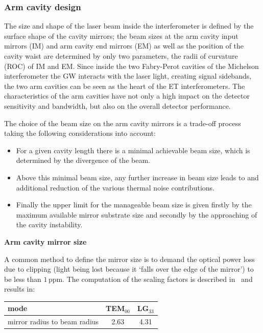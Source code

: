 \subsubsection{Arm cavity design}
\label{sec:arm_cavity_design}

The size and shape of the laser beam inside the interferometer is defined by the surface shape of the cavity mirrors; the beam sizes at the arm cavity input mirrors (IM) and arm cavity end mirrors (EM) as well as the position of the cavity waist are determined by only two parameters, the radii of curvature (ROC) of IM and EM. Since inside the two Fabry-Perot cavities of the Michelson interferometer the GW interacts with the laser light, creating signal sidebands, the two arm cavities can be seen as the heart of the ET interferometers. The characteristics of the arm cavities have not only a high impact on the detector sensitivity and bandwidth, but also on the overall detector performance.

The choice of the beam size on the arm cavity mirrors is a trade-off process taking the following considerations into account:
\begin{itemize}
  \item For a given cavity length there is a minimal achievable beam size, which is determined by the divergence of the beam.
\item Above this minimal beam size, any further increase in beam size leads to and additional reduction of the various thermal noise contributions.
\item Finally the upper limit for the manageable beam size is given firstly by the maximum available mirror substrate size and secondly by the approaching of the cavity instability.
\end{itemize}

\textbf{Arm cavity mirror size}

A common method to define the mirror size is to demand the optical power loss due to clipping (light being lost because it `falls over the edge of the mirror') to be less than $1\,$ppm. The computation of the scaling factors is described in~\cite{Chelkowski2009} and results in:
\begin{center}
\begin{tabular}{|l|c|c|}
	\hline
	mode  & TEM$_{00}$ & LG$_{33}$\\
	\hline
	mirror radius to beam  radius & 2.63 & 4.31\\
	\hline
\end{tabular}
\end{center}

